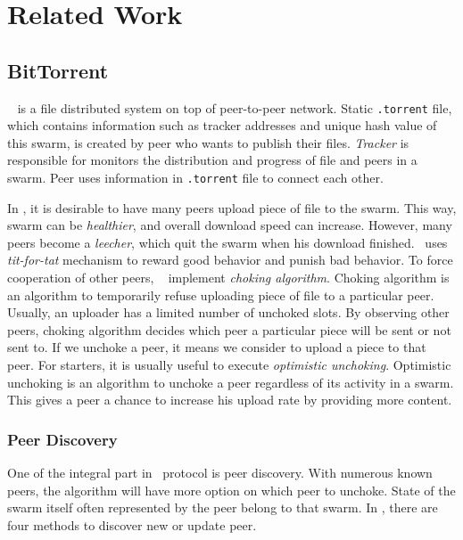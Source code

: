 \chapter{Related Work}
\label{chp:relwork}

\section{BitTorrent}
\bt~\cite{2003:bittorrent:cohen} is a file distributed system on top of peer-to-peer network. Static \texttt{.torrent} file, which contains information such as tracker addresses and unique hash value of this swarm, is created by peer who wants to publish their files. \textit{Tracker} is responsible for monitors the distribution and progress of file and peers in a swarm. Peer uses information in \texttt{.torrent} file to connect each other.

In \bt, it is desirable to have many peers upload piece of file to the swarm. This way, swarm can be \textit{healthier}, and overall download speed can increase. However, many peers become a \textit{leecher}, which quit the swarm when his download finished. \bt~uses \textit{tit-for-tat} mechanism to reward good behavior and punish bad behavior. To force cooperation of other peers, \bt~ implement \textit{choking algorithm}. Choking algorithm is an algorithm to temporarily refuse uploading piece of file to a particular peer. Usually, an uploader has a limited number of unchoked slots. By observing other peers, choking algorithm decides which peer a particular piece will be sent or not sent to. If we unchoke a peer, it means we consider to upload a piece to that peer. For starters, it is usually useful to execute \textit{optimistic unchoking}. Optimistic unchoking is an algorithm to unchoke a peer regardless of its activity in a swarm. This gives a peer a chance to increase his upload rate by providing more content.

\subsection{Peer Discovery}
One of the integral part in \bt~protocol is peer discovery. With numerous known peers, the algorithm will have more option on which peer to unchoke. State of the swarm itself often represented by the peer belong to that swarm. In \bt, there are four methods to discover new or update peer. 


